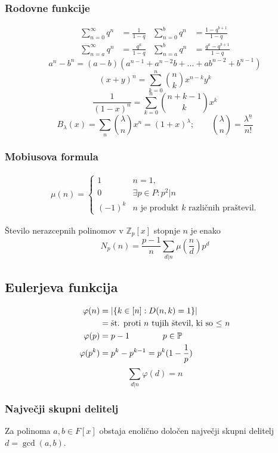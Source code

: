 \subsubsection*{Rodovne funkcije}
\[
	\begin{aligned}
		\sum_{n=0}^{\infty} q^n &= \frac{1}{1-q} &
		\sum_{n=0}^{b} q^n &= \frac{1-q^{b+1}}{1-q}
		\\
		\sum_{n=a}^{\infty} q^n &= \frac{q^{a}}{1-q} &
		\sum_{n=a}^{b} q^n &= \frac{q^a-q^{b+1}}{1-q}
	\end{aligned}
\]
\[
	a^n - b^n = (a-b)(a^{n-1} + a^{n-2}b + ... + ab^{n-2} + b^{n-1})  
\]
\[ (x+y)^n = \sum_{k=0}^{n} \binom{n}{k} x^{n-k}y^{k} \]
\[ \frac{1}{(1-x)^n} = \sum_{k=0}^{n} \binom{n+k-1}{k} x^{k} \]
\[ B_\lambda(x) = \sum_{n} \binom{\lambda}{n} x^{n} = (1+x)^\lambda; \qquad \binom{\lambda}{n} = \frac{\lambda^{\underline{n}}}{n!}\]

\subsubsection*{Mobiusova formula}
\begin{align*}
	\mu(n) = \begin{cases}
		1 &n = 1, \\
		0 &\exists p \in P: p^2 | n \\
		(-1)^k &\text{$n$ je produkt $k$ različnih praštevil.}
	\end{cases}
\end{align*}

Število nerazcepnih polinomov v $\mathbb{Z}_p[x]$ stopnje $n$ je enako
\[ N_p(n) = \frac{p-1}{n} \sum_{d|n} \mu(\frac{n}{d}) p^d\]

\subsection*{Eulerjeva funkcija}
\[ 
	\begin{aligned}
		\varphi (n) &= |\{k\in [n] : D(n,k) = 1 \}| \\
				&= \textmd{št. proti $n$ tujih števil, ki so $\leq$ $n$} \\
		\varphi(p) &= p-1 \qquad \qquad p \in \mathbb{P}\\
		\varphi(p^k) &= p^k-p^{k-1} = p^k(1-\frac{1}{p})\\
	\end{aligned}
\]
\[\sum_{d|n} \varphi(d) = n\]

\subsubsection*{Največji skupni delitelj}
Za polinoma $a,b \in F[x]$ obstaja enolično določen največji skupni delitelj $d = \gcd(a,b)$.
